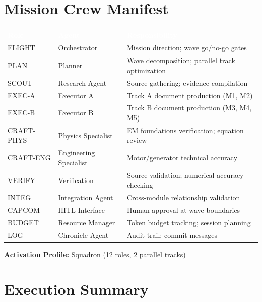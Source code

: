 \documentclass[11pt,letterpaper]{article}
\newcommand{\tableheader}[1]{\textbf{\sffamily\textcolor{white}{#1}}}
\begin{document}
\section{Mission Crew Manifest}

\begin{center}
\begin{tabularx}{\textwidth}{C{1.8cm}C{2cm}X}
\toprule
{}
\tableheader{Role} & \tableheader{Agent} & \tableheader{Responsibility} \\
\midrule
FLIGHT & Orchestrator & Mission direction; wave go/no-go gates \\
PLAN & Planner & Wave decomposition; parallel track optimization \\
SCOUT & Research Agent & Source gathering; evidence compilation \\
EXEC-A & Executor A & Track A document production (M1, M2) \\
EXEC-B & Executor B & Track B document production (M3, M4, M5) \\
CRAFT-PHYS & Physics Specialist & EM foundations verification; equation review \\
CRAFT-ENG & Engineering Specialist & Motor/generator technical accuracy \\
VERIFY & Verification & Source validation; numerical accuracy checking \\
INTEG & Integration Agent & Cross-module relationship validation \\
CAPCOM & HITL Interface & Human approval at wave boundaries \\
BUDGET & Resource Manager & Token budget tracking; session planning \\
LOG & Chronicle Agent & Audit trail; commit messages \\
\bottomrule
\end{tabularx}
\end{center}

\textbf{Activation Profile:} Squadron (12 roles, 2 parallel tracks)

\section{Execution Summary}
\end{document}
